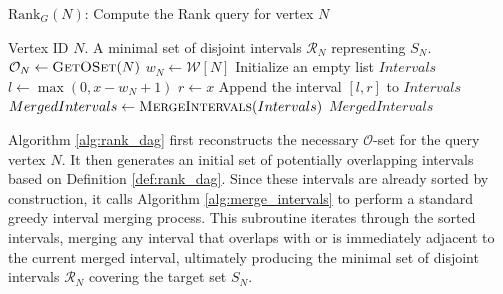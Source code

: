 \begin{algorithm}
    \caption{$\mathrm{Rank}_G(N)$: Compute the Rank query for vertex $N$}
    \label{alg:rank_dag}
    \small %
    \begin{algorithmic}[1]
        \Require Vertex ID $N$.
        \Ensure A minimal set of disjoint intervals $\mathcal{R}_N$ representing $S_N$.
        \State $\mathcal{O}_N \gets \textsc{GetOSet}(N)$
        \State $w_N \gets \mathcal{W}[N]$
        \State Initialize an empty list $Intervals$
        \State $l \gets \max(0, x - w_N + 1)$
        \State $r \gets x$
        \State Append the interval $[l, r]$ to $Intervals$
        \EndFor
        \State $MergedIntervals \gets \textsc{MergeIntervals}(Intervals)$
        \State \Return $MergedIntervals$
    \end{algorithmic}
\end{algorithm}

Algorithm \ref{alg:rank_dag} first reconstructs the necessary $\mathcal{O}$-set for the query vertex $N$. It then generates an initial set of potentially overlapping intervals based on Definition \ref{def:rank_dag}. Since these intervals are already sorted by construction, it calls Algorithm \ref{alg:merge_intervals} to perform a standard greedy interval merging process. This subroutine iterates through the sorted intervals, merging any interval that overlaps with or is immediately adjacent to the current merged interval, ultimately producing the minimal set of disjoint intervals $\mathcal{R}_N$ covering the target set $S_N$.
